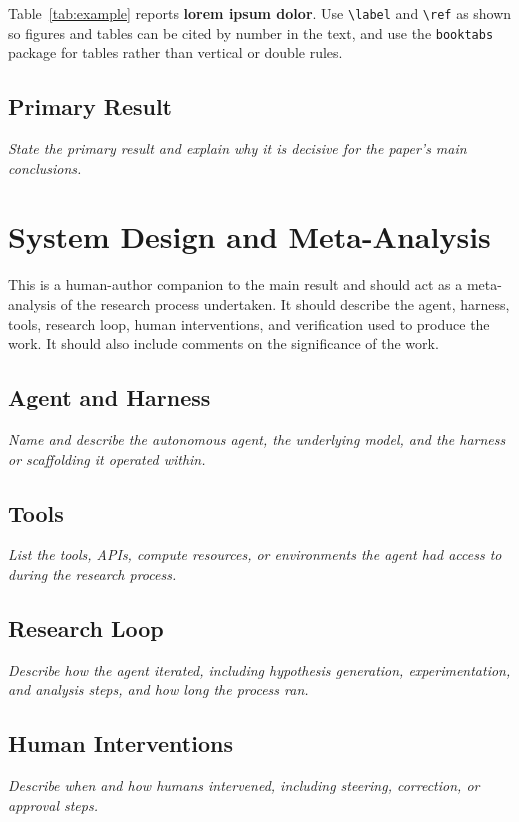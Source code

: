 \documentclass{article}
\begin{document}
Table~\ref{tab:example} reports \textbf{lorem ipsum dolor}. Use
\texttt{\textbackslash label} and \texttt{\textbackslash ref} as shown so
figures and tables can be cited by number in the text, and use the
\texttt{booktabs} package for tables rather than vertical or double rules.


\subsection{Primary Result}
\textit{State the primary result and explain why it is decisive for the
paper's main conclusions.}


\section{System Design and Meta-Analysis}
This is a human-author companion to the main result and should act as a meta-analysis of the research process undertaken. It should describe the agent, harness, tools, research loop, human interventions, and verification used to produce the work. It should also include comments on the significance of the work. 


\subsection{Agent and Harness}
\textit{Name and describe the autonomous agent, the underlying model, and the
harness or scaffolding it operated within.}


\subsection{Tools}
\textit{List the tools, APIs, compute resources, or environments the agent had
access to during the research process.}


\subsection{Research Loop}
\textit{Describe how the agent iterated, including hypothesis generation,
experimentation, and analysis steps, and how long the process ran.}


\subsection{Human Interventions}
\textit{Describe when and how humans intervened, including steering,
correction, or approval steps.}
\end{document}
